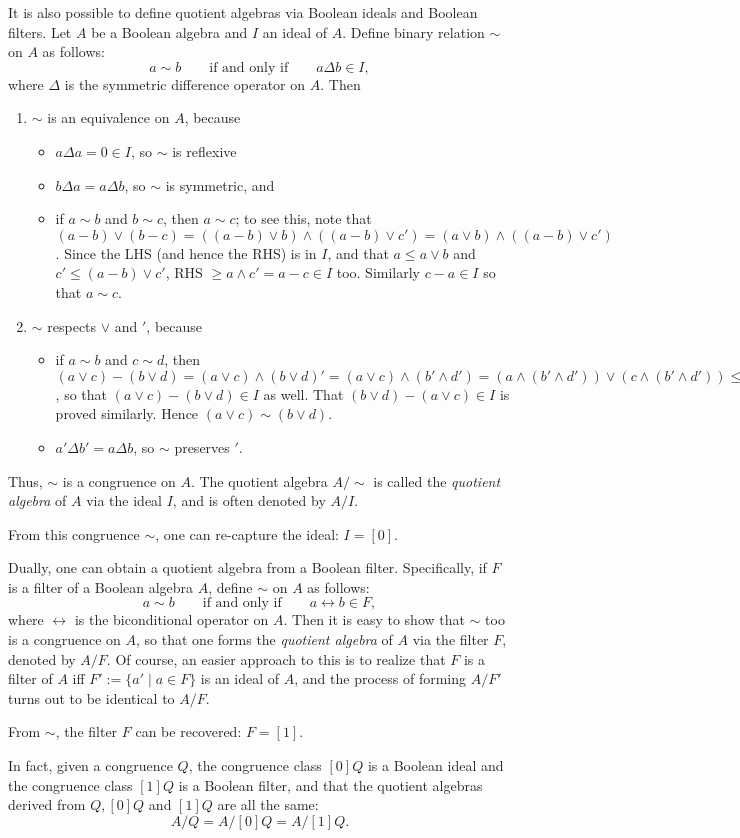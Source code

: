 \documentclass[12pt]{article}
\begin{document}
It is also possible to define quotient algebras via Boolean ideals and Boolean filters.  Let $A$ be a Boolean algebra and $I$ an ideal of $A$.  Define binary relation $\sim$ on $A$ as follows:
$$a\sim b\qquad \mbox{if and only if} \qquad a\Delta b\in I,$$
where $\Delta$ is the symmetric difference operator on $A$.  Then
\begin{enumerate}
\item $\sim$ is an equivalence on $A$, because
\begin{itemize}
\item $a\Delta a=0\in I$, so $\sim$ is reflexive
\item $b\Delta a=a\Delta b$, so $\sim$ is symmetric, and
\item if $a\sim b$ and $b\sim c$, then $a\sim c$; to see this, note that $(a-b)\vee (b-c)=((a-b)\vee b)\wedge ((a-b)\vee c')=(a\vee b)\wedge ((a-b)\vee c')$.  Since the LHS (and hence the RHS) is in $I$, and that $a\le a\vee b$ and $c'\le (a-b)\vee c'$, RHS $\ge a\wedge c'=a-c\in I$ too.  Similarly $c-a\in I$ so that $a\sim c$.
\end{itemize}
\item $\sim$ respects $\vee$ and $'$, because
\begin{itemize}
\item if $a\sim b$ and $c\sim d$, then $(a\vee c)-(b\vee d)=(a\vee c)\wedge (b\vee d)'=(a\vee c)\wedge (b'\wedge d') = (a\wedge (b'\wedge d'))\vee (c\wedge (b'\wedge d'))\le (a\wedge b')\vee (c\wedge d')\in I$, so that $(a\vee c)-(b\vee d)\in I$ as well.  That $(b\vee d)-(a\vee c)\in I$ is proved similarly.  Hence $(a\vee c)\sim (b\vee d)$.
\item $a'\Delta b'=a\Delta b$, so $\sim$ preserves $'$.
\end{itemize}
\end{enumerate}
Thus, $\sim$ is a congruence on $A$.  The quotient algebra $A/\sim$ is called the \emph{quotient algebra} of $A$ via the ideal $I$, and is often denoted by $A/I$.

From this congruence $\sim$, one can re-capture the ideal: $I=[0]$.

Dually, one can obtain a quotient algebra from a Boolean filter.  Specifically, if $F$ is a filter of a Boolean algebra $A$, define $\sim$ on $A$ as follows:
$$a\sim b\qquad \mbox{if and only if} \qquad a\leftrightarrow b\in F,$$
where $\leftrightarrow$ is the biconditional operator on $A$.  Then it is easy to show that $\sim$ too is a congruence on $A$, so that one forms the \emph{quotient algebra} of $A$ via the filter $F$, denoted by $A/F$.  Of course, an easier approach to this is to realize that $F$ is a filter of $A$ iff $F':=\lbrace a'\mid a\in F\rbrace$ is an ideal of $A$, and the process of forming $A/F'$ turns out to be identical to $A/F$.

From $\sim$, the filter $F$ can be recovered: $F=[1]$.

In fact, given a congruence $Q$, the congruence class $[0]Q$ is a Boolean ideal and the congruence class $[1]Q$ is a Boolean filter, and that the quotient algebras derived from $Q,[0]Q$ and $[1]Q$ are all the same: $$A/Q=A/[0]Q=A/[1]Q.$$
\end{document}
